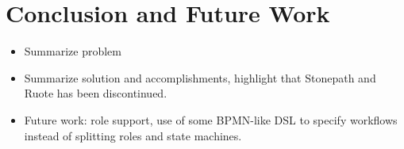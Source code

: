 \documentclass[document.tex]{subfiles}
\begin{document}
\chapter{Conclusion and Future Work}
\label {ch:conclusion}


\begin{itemize}
\item Summarize problem
\item Summarize solution and accomplishments, highlight that Stonepath and Ruote has been discontinued.
\item Future work: role support, use of some BPMN-like DSL to specify workflows instead of splitting roles and state machines.
\end{itemize}
\end{document}
